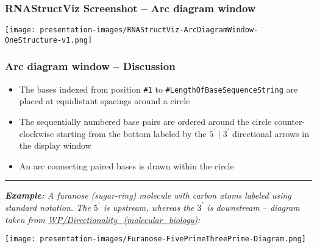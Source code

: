 \documentclass[usenames,svgnames,dvipsnames,11pt]{beamer}
\begin{document}
\begin{frame}[fragile]
\frametitle{RNAStructViz Screenshot -- Arc diagram window}


\begin{center}
\texttt{[image: presentation-images/RNAStructViz-ArcDiagramWindow-OneStructure-v1.png]}
\end{center}

\end{frame}

\begin{frame}
\frametitle{Arc diagram window -- Discussion}

\begin{itemize} 

\item The bases indexed from position \texttt{\#1} to \texttt{\#LengthOfBaseSequenceString} are placed at 
      equidistant spacings around a circle 
\item The sequentially numbered base pairs are ordered around the circle counter-clockwise 
      starting from the bottom labeled by the 
      $5^{\prime} \mid 3^{\prime}$ directional arrows in the display window 
\item An arc connecting paired bases is drawn within the circle 

\end{itemize}

\medskip\hrule\medskip
\noindent\it\small 
\textbf{Example:} A furanose (sugar-ring) molecule with carbon atoms labeled using standard notation. 
The $5^{\prime}$ is upstream, whereas the $3^{\prime}$ is downstream -- 
diagram taken from \url{WP/Directionality_(molecular_biology)}: 
\begin{center}
\texttt{[image: presentation-images/Furanose-FivePrimeThreePrime-Diagram.png]}
\end{center}

\end{frame}
\end{document}

